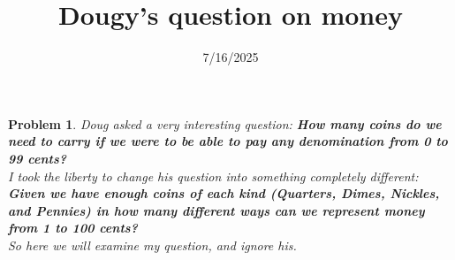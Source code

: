 \documentclass{article}
\title{Dougy's question on money}
\date{7/16/2025}
\newtheorem*{problem*}{Problem}
\begin{document}
\maketitle

\begin{problem*}
    Doug asked a very interesting question: \textbf{How many coins 
    do we need to carry if we were to be able to pay 
    any denomination from 0 to 99 cents?}\\

    I took the liberty to change his question into something 
    completely different: \textbf{Given we have enough coins of each kind
    (Quarters, Dimes, Nickles, and Pennies) in how many different ways 
    can we represent money from 1 to 100 cents?}\\

    So here we will examine my question, and ignore his.
\end{problem*}
\end{document}
